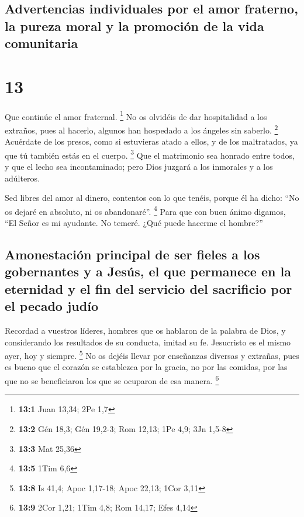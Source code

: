 \hypertarget{advertencias-individuales-por-el-amor-fraterno-la-pureza-moral-y-la-promociuxf3n-de-la-vida-comunitaria}{%
\subsection{Advertencias individuales por el amor fraterno, la pureza
moral y la promoción de la vida
comunitaria}\label{advertencias-individuales-por-el-amor-fraterno-la-pureza-moral-y-la-promociuxf3n-de-la-vida-comunitaria}}

\hypertarget{section-12}{%
\section{13}\label{section-12}}

 Que continúe el amor fraternal. \footnote{\textbf{13:1}
  Juan 13,34; 2Pe 1,7}  No os olvidéis de dar hospitalidad
a los extraños, pues al hacerlo, algunos han hospedado a los ángeles sin
saberlo. \footnote{\textbf{13:2} Gén 18,3; Gén 19,2-3; Rom 12,13; 1Pe
  4,9; 3Jn 1,5-8}  Acuérdate de los presos, como si
estuvieras atado a ellos, y de los maltratados, ya que tú también estás
en el cuerpo. \footnote{\textbf{13:3} Mat 25,36}  Que el
matrimonio sea honrado entre todos, y que el lecho sea incontaminado;
pero Dios juzgará a los inmorales y a los adúlteros.

 Sed libres del amor al dinero, contentos con lo que
tenéis, porque él ha dicho: ``No os dejaré en absoluto, ni os
abandonaré''. \footnote{\textbf{13:5} 1Tim 6,6}  Para que
con buen ánimo digamos, ``El Señor es mi ayudante. No temeré. ¿Qué puede
hacerme el hombre?''

\hypertarget{amonestaciuxf3n-principal-de-ser-fieles-a-los-gobernantes-y-a-jesuxfas-el-que-permanece-en-la-eternidad-y-el-fin-del-servicio-del-sacrificio-por-el-pecado-juduxedo}{%
\subsection{Amonestación principal de ser fieles a los gobernantes y a
Jesús, el que permanece en la eternidad y el fin del servicio del
sacrificio por el pecado
judío}\label{amonestaciuxf3n-principal-de-ser-fieles-a-los-gobernantes-y-a-jesuxfas-el-que-permanece-en-la-eternidad-y-el-fin-del-servicio-del-sacrificio-por-el-pecado-juduxedo}}

 Recordad a vuestros líderes, hombres que os hablaron de
la palabra de Dios, y considerando los resultados de su conducta, imitad
su fe.  Jesucristo es el mismo ayer, hoy y siempre.
\footnote{\textbf{13:8} Is 41,4; Apoc 1,17-18; Apoc 22,13; 1Cor 3,11}
 No os dejéis llevar por enseñanzas diversas y extrañas,
pues es bueno que el corazón se establezca por la gracia, no por las
comidas, por las que no se beneficiaron los que se ocuparon de esa
manera. \footnote{\textbf{13:9} 2Cor 1,21; 1Tim 4,8; Rom 14,17; Efes
  4,14}

